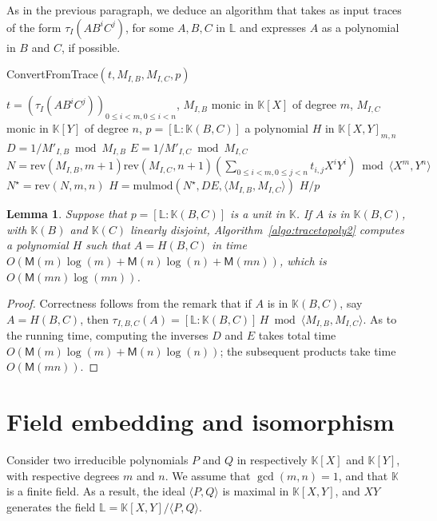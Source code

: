 \documentclass[12pt]{article}
\def\M {\ensuremath{\mathsf{M}}}
\def\K {\ensuremath{\mathbb{K}}}
\def\L {\ensuremath{\mathbb{L}}}
\def\mulmod {\ensuremath{\mathrm{mulmod}}}
\def\rev {\ensuremath{\mathrm{rev}}}
\newtheorem{Lemma}{Lemma}
\begin{document}
As in the previous paragraph, we deduce an algorithm that takes as
input traces of the form $\tau_I(A B^i C^j)$, for some $A,B,C$ in $\L$
and expresses $A$ as a polynomial in $B$ and $C$, if possible.
\begin{algorithm}[H]
  \caption{ConvertFromTrace$(t, M_{I,B}, M_{I,C}, p)$}
  \begin{algorithmic}[1]
    \REQUIRE  $t=(\tau_I(A B^iC^j))_{0 \le i < m, 0 \le i < n}$, $M_{I,B}$ monic in $\K[X]$ of degree $m$,
    $M_{I,C}$ monic in $\K[Y]$ of degree $n$, 
    $p=[\L:\K(B,C)]$
    \ENSURE a polynomial $H$ in $\K[X,Y]_{m,n}$
    \STATE $D =  1/M'_{I,B} \bmod M_{I,B}$
    \STATE $E =  1/M'_{I,C} \bmod M_{I,C}$
    \STATE $N=\rev(M_{I,B}, m+1)\rev(M_{I,C}, n+1)( \sum_{0 \le i <m, 0 \le j < n} t_{i,j} X^iY^i) \bmod \langle X^m, Y^n \rangle$
    \STATE $N^\star = \rev(N, m, n)$
    \STATE $H=\mulmod(N^\star, D E, \langle M_{I,B}, M_{I,C} \rangle)$
    \RETURN $H/p$
  \end{algorithmic}
  \label{algo:tracetopoly2}
\end{algorithm}

\begin{Lemma}
  Suppose that $p=[\L:\K(B,C)]$ is a unit in $\K$. If $A$ is in
  $\K(B,C)$, with $\K(B)$ and $\K(C)$ linearly disjoint,
  Algorithm~\ref{algo:tracetopoly2} computes a polynomial $H$ such
  that $A=H(B,C)$ in time $O(\M(m)\log(m)+\M(n)\log(n)+\M(mn))$, which
  is $O(\M(mn)\log(mn))$.
\end{Lemma}
\begin{proof}
  Correctness follows from the remark that if $A$ is in $\K(B,C)$, say
  $A=H(B,C)$, then $\tau_{I,B,C} (A)=[\L:\K(B,C)]\, H \bmod \langle
  M_{I,B}, M_{I,C} \rangle$.  As to the running time, computing
  the inverses $D$ and $E$ takes total time $O(\M(m)\log(m)+\M(n)\log(n))$;
  the subsequent products take time $O(\M(mn))$.
\end{proof}


\section{Field embedding and isomorphism} 

Consider two irreducible polynomials $P$ and $Q$ in respectively
$\K[X]$ and $\K[Y]$, with respective degrees $m$ and $n$. We assume
that $\gcd(m,n)=1$, and that $\K$ is a finite field. As a result, the
ideal $\langle P, Q\rangle$ is maximal in $\K[X,Y]$, and $XY$
generates the field $\L=\K[X,Y]/\langle P, Q \rangle$.
\end{document}
